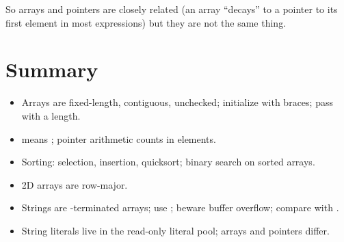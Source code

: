 So arrays and pointers are closely related (an array ``decays'' to a pointer to its first
element in most expressions) but they are not the same thing.

\section{Summary}
\begin{itemize}
  \item Arrays are fixed-length, contiguous, unchecked; initialize with braces; pass with a
    length.
  \item {} means ; pointer arithmetic counts in elements.
  \item Sorting: selection, insertion, quicksort; binary search on sorted arrays.
  \item 2D arrays are row-major.
  \item Strings are -terminated  arrays; use
    ; beware buffer overflow; compare with .
  \item String literals live in the read-only literal pool; arrays and pointers differ.
\end{itemize}
